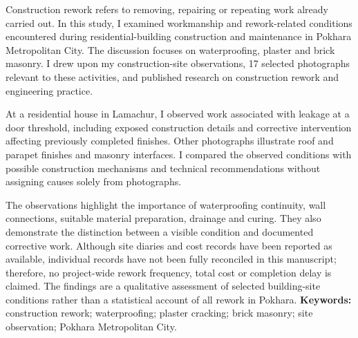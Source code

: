 \begingroup\setlength{\parindent}{2em}
Construction rework refers to removing, repairing or repeating work already carried out. In this study, I examined workmanship and rework-related conditions encountered during residential-building construction and maintenance in Pokhara Metropolitan City. The discussion focuses on waterproofing, plaster and brick masonry. I drew upon my construction-site observations, 17 selected photographs relevant to these activities, and published research on construction rework and engineering practice.

At a residential house in Lamachur, I observed work associated with leakage at a door threshold, including exposed construction details and corrective intervention affecting previously completed finishes. Other photographs illustrate roof and parapet finishes and masonry interfaces. I compared the observed conditions with possible construction mechanisms and technical recommendations without assigning causes solely from photographs.

The observations highlight the importance of waterproofing continuity, wall connections, suitable material preparation, drainage and curing. They also demonstrate the distinction between a visible condition and documented corrective work. Although site diaries and cost records have been reported as available, individual records have not been fully reconciled in this manuscript; therefore, no project-wide rework frequency, total cost or completion delay is claimed. The findings are a qualitative assessment of selected building-site conditions rather than a statistical account of all rework in Pokhara.
\endgroup
\vspace{0.7em}
\noindent\textbf{Keywords:} construction rework; waterproofing; plaster cracking; brick masonry; site observation; Pokhara Metropolitan City.
